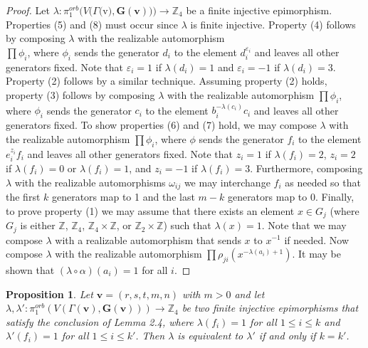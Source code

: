 \documentclass{amsart}
\newtheorem{proposition}[theorem]{Proposition}
\theoremstyle{definition}
\numberwithin{equation}{section}
\begin{document}
\begin{proof}
Let $\lambda:\pi_1^{orb}(V(\Gamma($v$), {\mathbf{G(v)}}))\longrightarrow{\mathbb{Z}_{4}}$ be a finite injective epimorphism. Properties (5) and (8) must occur since $\lambda$ is finite injective. Property (4) follows by composing $\lambda$ with the realizable automorphism \\$\prod\phi_i$, where $\phi_i$ sends the generator $d_i$ to the element $d_i^{{\varepsilon}_i}$ and leaves all other generators fixed. Note that $\varepsilon_i=1$ if $\lambda(d_i)=1$ and $\varepsilon_i=-1$ if $\lambda(d_i)=3$. Property (2) follows by a similar technique. Assuming property (2) holds, property (3) follows by composing $\lambda$ with the realizable automorphism $\prod\phi_i$, where $\phi_i$ sends the generator $c_i$ to the element $b_i^{-\lambda(c_i)}c_i$ and leaves all other generators fixed. To show properties (6) and (7) hold, we may compose $\lambda$ with the realizable automorphism $\prod\phi_i$, where $\phi$ sends the generator $f_i$ to the element $e_i^{z_i}f_i$ and leaves all other generators fixed. Note that $z_i=1$ if $\lambda(f_i)=2$, $z_i=2$ if $\lambda(f_i)=0$ or $\lambda(f_i)=1$, and $z_i=-1$ if $\lambda(f_i)=3$. Furthermore, composing $\lambda$ with the realizable automorphisms $\omega_{ij}$ we may interchange $f_i$ as needed so that the first $k$ generators map to 1 and the last $m-k$ generators map to 0. Finally, to prove property (1) we may assume that there exists an element $x\in G_j$ (where $G_j$ is either $\mathbb{Z}$, $\mathbb{Z}_4$, $\mathbb{Z}_4\times\mathbb{Z}$, or $\mathbb{Z}_2\times\mathbb{Z}$) such that $\lambda(x)=1$. Note that we may compose $\lambda$ with a realizable automorphism that sends $x$ to $x^{-1}$ if needed. Now compose $\lambda$ with the realizable automorphism $\prod\rho_{ji}(x^{-\lambda(a_i)+1})$. It may be shown that $(\lambda\circ\alpha)(a_i)=1$ for all $i$.
\end{proof}



\begin{proposition}
Let ${\mathbf{v}}=(r,s,t,m,n)$ with $m>0$ and let \\$\lambda,\lambda':\pi_1^{orb}(V(\Gamma({\mathbf{v}}),{\mathbf{G(v)}}))\longrightarrow\mathbb{Z}_{4}$ be two finite injective epimorphisms that satisfy the conclusion of Lemma 2.4, where $\lambda(f_i)=1$ for all $1\leq{i}\leq{k}$ and $\lambda'(f_i)=1$ for all $1\leq{i}\leq{k'}$. Then $\lambda$ is equivalent to $\lambda'$ if and only if $k=k'$. 
\end{proposition}
\end{document}
